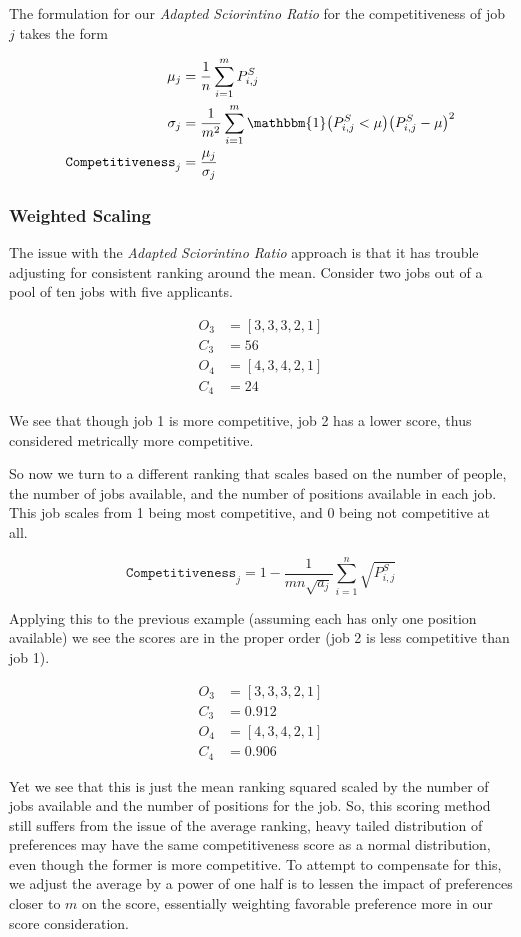 The formulation for our \textit{Adapted Sciorintino Ratio} for the competitiveness of job $j$ takes the form

\begin{align}
\mu_j &= \frac{1}{n} \sum_{i=1}^m P^S_{i,j} \\
\sigma_j &= \frac{1}{m^2} \sum_{i=1}^m \mathbbm{1}\big( P^S_{i,j} < \mu \big) \big(P^S_{i,j} - \mu \big)^2 \\
\texttt{Competitiveness}_j &= \frac{\mu_j}{\sigma_j}
\end{align}

\subsubsection{Weighted Scaling}

The issue with the \textit{Adapted Sciorintino Ratio} approach is that it has trouble adjusting for consistent ranking around the mean. Consider two jobs out of a pool of ten jobs with five applicants.

\begin{align}
O_3 &= [3,3,3,2,1] \\
C_3 &= 56\\
O_4 &= [4,3,4,2,1] \\
C_4 &= 24
\end{align}

We see that though job 1 is more competitive, job 2 has a lower score, thus considered metrically more competitive.

So now we turn to a different ranking that scales based on the number of people, the number of jobs available, and the number of positions available in each job. This job scales from 1 being most competitive, and 0 being not competitive at all.

\[\texttt{Competitiveness}_j = 1 - \frac{1}{mn \sqrt{a_j}} \sum_{i=1}^n \sqrt{P^S_{i,j}}\]

Applying this to the previous example (assuming each has only one position available) we see the scores are in the proper order (job 2 is less competitive than job 1).

\begin{align}
O_3 &= [3,3,3,2,1] \\
C_3 &= 0.912\\
O_4 &= [4,3,4,2,1] \\
C_4 &= 0.906
\end{align}

Yet we see that this is just the mean ranking squared scaled by the number of jobs available and the number of positions for the job. So, this scoring method still suffers from the issue of the average ranking, heavy tailed distribution of preferences may have the same competitiveness score as a normal distribution, even though the former is more competitive. To attempt to compensate for this, we adjust the average by a power of one half is to lessen the impact of preferences closer to $m$ on the score, essentially weighting favorable preference more in our score consideration.

